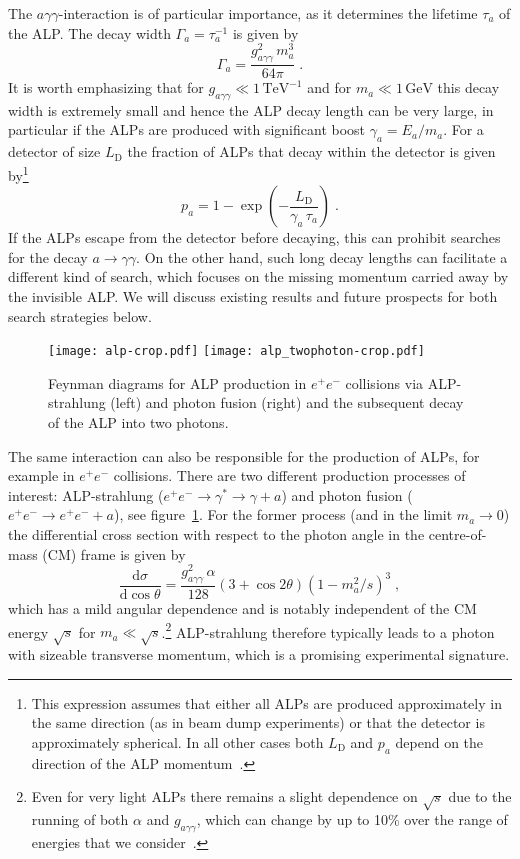 \documentclass[11pt,a4paper]{article}
\newcommand{\ga}{g_{a\gamma\gamma}}
\begin{document}
The $a\gamma\gamma$-interaction is of particular importance, as it determines the lifetime $\tau_a$ of the ALP. The decay width $\Gamma_a = \tau_a^{-1}$ is given by
\begin{equation}
\Gamma_a = \frac{\ga^2 \, m_{a}^3}{64 \pi} \; .
\end{equation}
It is worth emphasizing that for $\ga \ll 1\,\mathrm{TeV^{-1}}$ and for $m_a \ll 1\,\mathrm{GeV}$ this decay width is extremely small and hence the ALP decay length can be very large, in particular if the ALPs are produced with significant boost $\gamma_a = E_a / m_a$. For a detector of size $L_\mathrm{D}$ the fraction of ALPs that decay within the detector is given by\footnote{This expression assumes that either all ALPs are produced approximately in the same direction (as in beam dump experiments) or that the detector is approximately spherical. In all other cases both $L_\mathrm{D}$ and $p_a$ depend on the direction of the ALP momentum~\cite{Bauer:2017ris}.}
\begin{equation}
 p_a = 1 - \exp \left(- \frac{L_\mathrm{D}}{\gamma_a \, \tau_a} \right) \; .
\label{eq:decay}
\end{equation}
If the ALPs escape from the detector before decaying, this can prohibit searches for the decay $a \to \gamma\gamma$. On the other hand, such long decay lengths can facilitate a different kind of search, which focuses on the missing momentum carried away by the invisible ALP. We will discuss existing results and future prospects for both search strategies below.

\begin{figure}
\centering
\texttt{[image: alp-crop.pdf]}\qquad
\texttt{[image: alp\_twophoton-crop.pdf]}
\caption{\label{fig:production} Feynman diagrams for ALP production in $e^+ e^-$ collisions via ALP-strahlung (left) and photon fusion (right) and the subsequent decay of the ALP into two photons.}
\end{figure}

The same interaction can also be responsible for the production of ALPs, for example in $e^+ e^-$ collisions. There are two different production processes of interest: ALP-strahlung ($e^+ e^- \to \gamma^\ast \to \gamma + a$) and photon fusion ($e^+ e^- \to e^+ e^- + a$), see figure~\ref{fig:production}. For the former process (and in the limit $m_a \to 0$) the differential cross section with respect to the photon angle in the centre-of-mass (CM) frame is given by~\cite{Marciano:2016yhf}
\begin{equation}
 \frac{\mathrm{d}\sigma}{\mathrm{d}\cos\theta} = \frac{\ga^2 \, \alpha}{128} (3 + \cos 2 \theta) (1 - m_a^2/s)^3\; ,
\end{equation}
which has a mild angular dependence and is notably independent of the CM energy $\sqrt{s}$ for $m_a \ll \sqrt{s}$.\footnote{Even for very light ALPs there remains a slight dependence on $\sqrt{s}$ due to the running of both $\alpha$ and $\ga$, which can change by up to 10\% over the range of energies that we consider~\cite{Bauer:2017ris}.}
ALP-strahlung therefore typically leads to a photon with sizeable transverse momentum, which is a promising experimental signature. 
\end{document}
